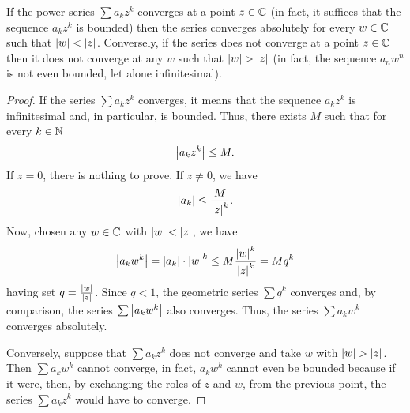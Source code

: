 \begin{theorem}
\mymark{***}%
If the power series $\sum a_k z^k$ converges at a point $z\in {\mathbb C}$
(in fact, it suffices that the sequence $a_k z^k$ is bounded)
then the series
converges absolutely for every $w\in {\mathbb C}$ such that ${\left|w\right|}< {\left|z\right|}$.
Conversely, if the series does not converge at a point $z\in {\mathbb C}$
then
it does not converge at any $w$ such that ${\left|w\right|} > {\left|z\right|}$ (in fact, the
sequence
$a_n w^n$ is not even bounded, let alone infinitesimal).
\end{theorem}
%
\begin{proof}
\mymark{*}
If the series $\sum a_k z^k$ converges, it means that the sequence
$a_k z^k$ is infinitesimal and, in particular, is bounded.
Thus, there exists $M$ such that for every $k\in {\mathbb N}$
\[
 {\left|a_k z^k\right|} \le M.
\]
If $z=0$, there is nothing to prove.
If $z\neq 0$, we have
\[
 {\left|a_k\right|} \le \frac{M}{{\left|z\right|}^k}.
\]
Now, chosen any $w\in {\mathbb C}$ with ${\left|w\right|} < {\left|z\right|}$, we have
\[
  {\left|a_k w^k\right|} = {\left|a_k\right|}\cdot {\left|w\right|}^k \le M \frac{{\left|w\right|}^k}{{\left|z\right|}^k}
  = M q^k
\]
having set $q = \frac{{\left|w\right|}}{{\left|z\right|}}$.
Since $q<1$, the geometric series $\sum q^k$ converges and, by comparison,
the series $\sum {\left|a_k w^k\right|}$ also converges.
Thus, the series $\sum a_k w^k$ converges absolutely.

Conversely, suppose that $\sum a_k z^k$ does not converge
and take $w$ with ${\left|w\right|} > {\left|z\right|}$.
Then $\sum a_k w^k$ cannot converge,
in fact, $a_k w^k$ cannot even be bounded because
if it were, then, by exchanging the roles of $z$ and $w$,
from the previous point, the series $\sum a_k z^k$ would have to converge.
\end{proof}

